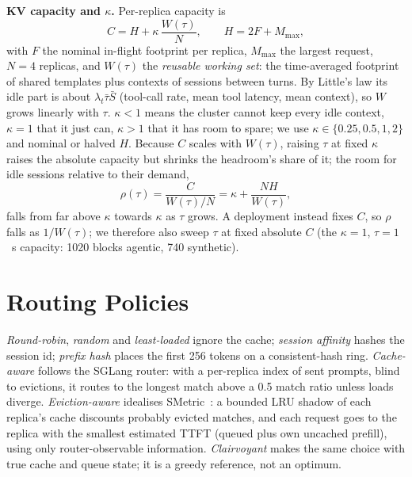 \documentclass[conference]{IEEEtran}
\begin{document}
\textbf{KV capacity and $\kappa$.} Per-replica capacity is
\begin{equation}
C=H+\kappa\,\frac{W(\tau)}{N},\qquad H=2F+M_{\max},
\label{eq:cap}
\end{equation}
with $F$ the nominal in-flight footprint per replica, $M_{\max}$ the largest request, $N=4$ replicas, and $W(\tau)$ the \emph{reusable working set}: the time-averaged footprint of shared templates plus contexts of sessions between turns. By Little's law its idle part is about $\lambda_t\bar\tau\bar S$ (tool-call rate, mean tool latency, mean context), so $W$ grows linearly with $\tau$. $\kappa<1$ means the cluster cannot keep every idle context, $\kappa=1$ that it just can, $\kappa>1$ that it has room to spare; we use $\kappa\in\{0.25,0.5,1,2\}$ and nominal or halved $H$. Because $C$ scales with $W(\tau)$, raising $\tau$ at fixed $\kappa$ raises the absolute capacity but shrinks the headroom's share of it; the room for idle sessions relative to their demand,
\begin{equation}
\rho(\tau)=\frac{C}{W(\tau)/N}=\kappa+\frac{N H}{W(\tau)},
\label{eq:rho}
\end{equation}
falls from far above $\kappa$ towards $\kappa$ as $\tau$ grows. A deployment instead fixes $C$, so $\rho$ falls as $1/W(\tau)$; we therefore also sweep $\tau$ at fixed absolute $C$ (the $\kappa=1$, $\tau=1$~s capacity: 1020 blocks agentic, 740 synthetic).

\section{Routing Policies}
\label{sec:policies}

\emph{Round-robin}, \emph{random} and \emph{least-loaded} ignore the cache; \emph{session affinity} hashes the session id; \emph{prefix hash} places the first 256 tokens on a consistent-hash ring. \emph{Cache-aware} follows the SGLang router: with a per-replica index of sent prompts, blind to evictions, it routes to the longest match above a 0.5 match ratio unless loads diverge. \emph{Eviction-aware} idealises SMetric~\cite{r8}: a bounded LRU shadow of each replica's cache discounts probably evicted matches, and each request goes to the replica with the smallest estimated TTFT (queued plus own uncached prefill), using only router-observable information. \emph{Clairvoyant} makes the same choice with true cache and queue state; it is a greedy reference, not an optimum.
\end{document}
